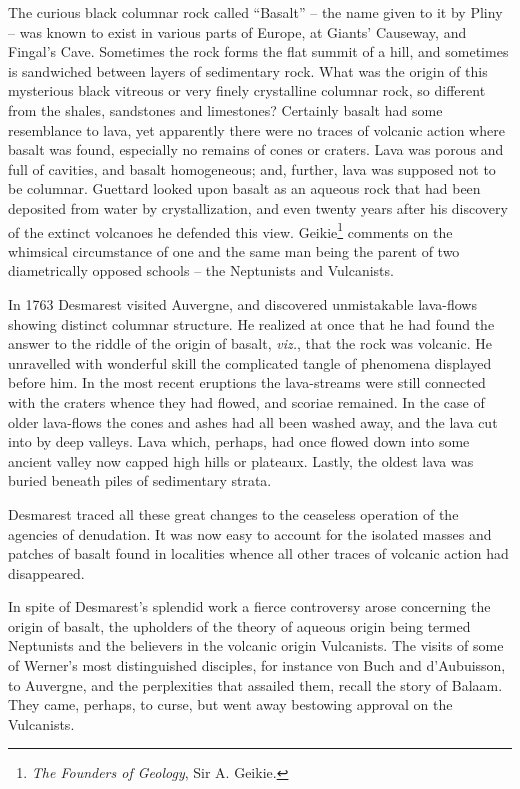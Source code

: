 \documentclass[a4paper, 12pt, oneside]{article}
\begin{document}
The curious black columnar rock called ``Basalt'' -- the name given to it by Pliny -- was known to exist in various parts of Europe, at Giants' Causeway, and Fingal's Cave. Sometimes the rock forms the flat summit of a hill, and sometimes is sandwiched between layers of sedimentary rock. What was the origin of this mysterious black vitreous or very finely crystalline columnar rock, so different from the shales, sandstones and limestones? Certainly basalt had some resemblance to lava, yet apparently there were no traces of volcanic action where basalt was found, especially no remains of cones or craters. Lava was porous and full of cavities, and basalt homogeneous; and, further, lava was supposed not to be columnar. Guettard looked upon basalt as an aqueous rock that had been deposited from water by crystallization, and even twenty years after his discovery of the extinct volcanoes he defended this view. Geikie\footnote{\emph{The Founders of Geology}, Sir A. Geikie.} comments on the whimsical circumstance of one and the same man being the parent of two diametrically opposed schools -- the Neptunists and Vulcanists.

In 1763 Desmarest visited Auvergne, and discovered unmistakable lava-flows showing distinct columnar structure. He realized at once that he had found the answer to the riddle of the origin of basalt, \emph{viz.}, that the rock was volcanic. He unravelled with wonderful skill the complicated tangle of phenomena displayed before him. In the most recent eruptions the lava-streams were still connected with the craters whence they had flowed, and scoriae remained. In the case of older lava-flows the cones and ashes had all been washed away, and the lava cut into by deep valleys. Lava which, perhaps, had once flowed down into some ancient valley now capped high hills or plateaux. Lastly, the oldest lava was buried beneath piles of sedimentary strata.

Desmarest traced all these great changes to the ceaseless operation of the agencies of denudation. It was now easy to account for the isolated masses and patches of basalt found in localities whence all other traces of volcanic action had disappeared.

In spite of Desmarest's splendid work a fierce controversy arose concerning the origin of basalt, the upholders of the theory of aqueous origin being termed Neptunists and the believers in the volcanic origin Vulcanists. The visits of some of Werner's most distinguished disciples, for instance von Buch and d'Aubuisson, to Auvergne, and the perplexities that assailed them, recall the story of Balaam. They came, perhaps, to curse, but went away bestowing approval on the Vulcanists.
\end{document}
